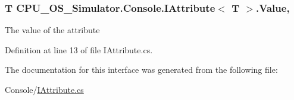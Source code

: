 \subsubsection[{Value}]{\setlength{\rightskip}{0pt plus 5cm}T {\bf C\+P\+U\+\_\+\+O\+S\+\_\+\+Simulator.\+Console.\+I\+Attribute}$<$ T $>$.Value\hspace{0.3cm}{\ttfamily [get]}, {\ttfamily [set]}}\label{interface_c_p_u___o_s___simulator_1_1_console_1_1_i_attribute_ad23a11dc6f96a7ed120819db250e3f4a}


The value of the attribute 



Definition at line 13 of file I\+Attribute.\+cs.



The documentation for this interface was generated from the following file\+:\begin{DoxyCompactItemize}
\item 
Console/\hyperlink{_console_2_i_attribute_8cs}{I\+Attribute.\+cs}\end{DoxyCompactItemize}
